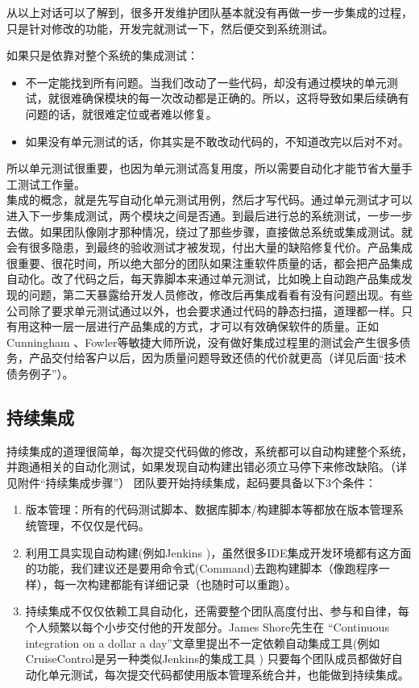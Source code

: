 从以上对话可以了解到，很多开发维护团队基本就没有再做一步一步集成的过程，只是针对修改的功能，开发完就测试一下，然后便交到系统测试。

如果只是依靠对整个系统的集成测试：

\begin{itemize}
\tightlist
\item
  不一定能找到所有问题。当我们改动了一些代码，却没有通过模块的单元测试，就很难确保模块的每一次改动都是正确的。所以，这将导致如果后续确有问题的话，就很难定位或者难以修复。
\item
  如果没有单元测试的话，你其实是不敢改动代码的，不知道改完以后对不对。
\end{itemize}

所以单元测试很重要，也因为单元测试高复用度，所以需要自动化才能节省大量手工测试工作量。\\
集成的概念，就是先写自动化单元测试用例，然后才写代码。通过单元测试才可以进入下一步集成测试，两个模块之间是否通。到最后进行总的系统测试，一步一步去做。如果团队像刚才那种情况，绕过了那些步骤，直接做总系统或集成测试。就会有很多隐患，到最终的验收测试才被发现，付出大量的缺陷修复代价。产品集成很重要、很花时间，所以绝大部分的团队如果注重软件质量的话，都会把产品集成自动化。改了代码之后，每天靠脚本来通过单元测试，比如晚上自动跑产品集成发现的问题，第二天暴露给开发人员修改，修改后再集成看看有没有问题出现。有些公司除了要求单元测试通过以外，也会要求通过代码的静态扫描，道理都一样。只有用这种一层一层进行产品集成的方式，才可以有效确保软件的质量。正如Cunningham
、Fowler等敏捷大师所说，没有做好集成过程里的测试会产生很多债务，产品交付给客户以后，因为质量问题导致还债的代价就更高（详见后面``技术债务例子''）。

\hypertarget{ux6301ux7eedux96c6ux6210}{%
\subsection{持续集成}\label{ux6301ux7eedux96c6ux6210}}

持续集成的道理很简单，每次提交代码做的修改，系统都可以自动构建整个系统，并跑通相关的自动化测试，如果发现自动构建出错必须立马停下来修改缺陷。（详见附件``持续集成步骤''）
团队要开始持续集成，起码要具备以下3个条件：

\begin{enumerate}
\tightlist
\item
  版本管理：所有的代码测试脚本、数据库脚本/构建脚本等都放在版本管理系统管理，不仅仅是代码。
\item
  利用工具实现自动构建(例如Jenkins
  )，虽然很多IDE集成开发环境都有这方面的功能，我们建议还是要用命令式(Command)去跑构建脚本（像跑程序一样），每一次构建都能有详细记录（也随时可以重跑）。
\item
  持续集成不仅仅依赖工具自动化，还需要整个团队高度付出、参与和自律，每个人频繁以每个小步交付他的开发部分。James
  Shore先生在 ``Continuous integration on a dollar a
  day''文章里提出不一定依赖自动集成工具(例如CruiseControl是另一种类似Jenkins的集成工具
  )
  只要每个团队成员都做好自动化单元测试，每次提交代码都使用版本管理系统合并，也能做到持续集成。
\end{enumerate}

